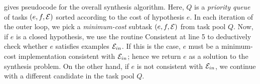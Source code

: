  
 
 
  gives pseudocode for the overall synthesis algorithm. Here, $Q$ is a \emph{priority queue} of
 tasks $(e, f, \mathcal{E})$ sorted according to the cost of hypothesis $e$. In each iteration of the outer loop, we pick
 a \emph{minimum-cost} subtask $(e, f, \mathcal{E})$ from task pool $Q$. Now, if $e$ is a closed hypothesis, 
 we use the
 routine {\sc Consistent} at line 5 to deductively check whether $e$ satisfies examples $\mathcal{E}_{in}$. If  this is the case,
$e$ must be a minimum-cost implementation consistent with $\mathcal{E}_{in}$; hence we return  $e$ as a solution to the synthesis problem. On the other
hand, if $e$ is not consistent with $\mathcal{E}_{in}$, we continue with a different candidate in the task pool $Q$.



